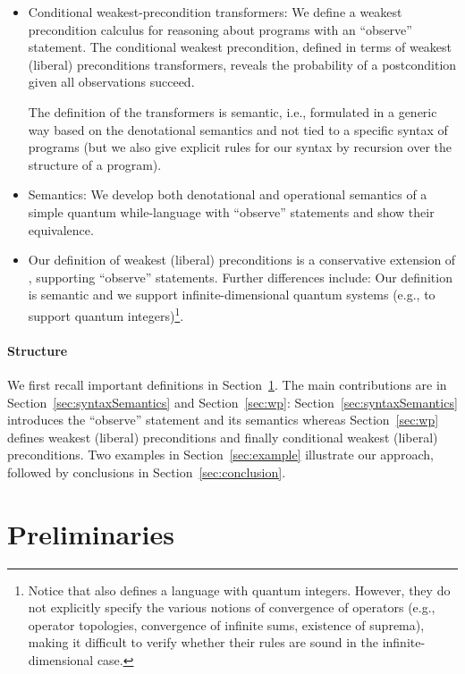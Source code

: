 \documentclass[a4paper,UKenglish,cleveref, autoref, thm-restate]{lipics-v2021}
\begin{document}
\begin{itemize}
    \item Conditional weakest-precondition transformers: We define a weakest precondition calculus for reasoning about programs with an ``observe'' statement. The conditional weakest precondition, defined in terms of weakest (liberal) preconditions transformers, reveals the probability of a postcondition given all observations succeed.

    The definition of the transformers is semantic, i.e., formulated in a generic way based on the denotational semantics and not tied to a specific syntax of programs (but we also give explicit rules for our syntax by recursion over the structure of a program).

    \item Semantics: We develop both denotational and operational semantics of a simple quantum while-language with ``observe'' statements and show their equivalence.

    \item Our definition of weakest (liberal) preconditions is a conservative extension of \cite{floydHoareLogic}, supporting ``observe'' statements.
    Further differences include: Our definition is semantic and we support infinite-dimensional quantum systems (e.g., to support quantum integers)\footnote{Notice that \cite{floydHoareLogic} also defines a language with quantum integers. However, they do not explicitly specify the various notions of convergence of operators (e.g., operator topologies, convergence of infinite sums, existence of suprema), making it difficult to verify whether their rules are sound in the infinite-dimensional case.}.
\end{itemize}


\paragraph*{Structure}
We first recall important definitions in Section~\ref{sec:preliminaries}. The main contributions are in Section~\ref{sec:syntaxSemantics} and Section~\ref{sec:wp}: Section~\ref{sec:syntaxSemantics} introduces the ``observe'' statement and its semantics whereas Section~\ref{sec:wp} defines weakest (liberal) preconditions and finally conditional weakest (liberal) preconditions.
Two examples in Section~\ref{sec:example} illustrate our approach, followed by conclusions in Section~\ref{sec:conclusion}. \section{Preliminaries}
\label{sec:preliminaries}
\end{document}
